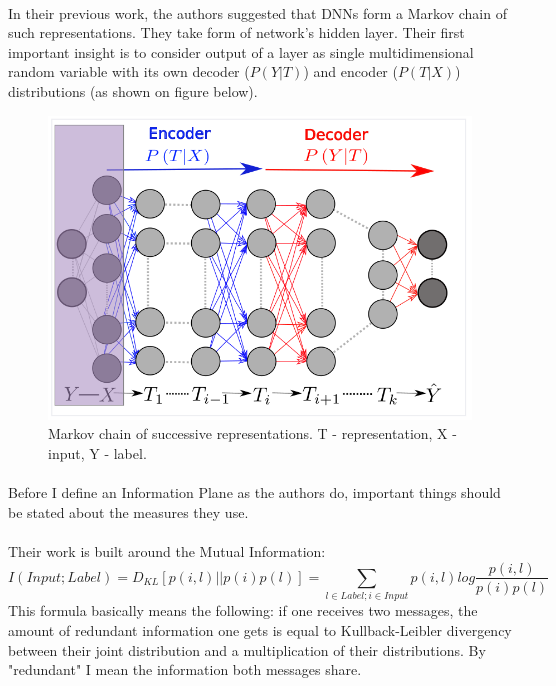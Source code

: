 \documentclass[a4paper,14pt]{extarticle}
\begin{document}
\paragraph{}
In their previous work\cite{tishby2015deep}, the authors suggested that DNNs form a Markov chain of such representations. They take form of network's hidden layer. Their first important insight is to consider output of a layer as single multidimensional random variable with its own decoder ($P(Y|T)$) and encoder ($P(T|X)$) distributions (as shown on figure below).
\begin{figure}[!h]
	\centering
	\includegraphics[width=\textwidth]{../presentation/MarkovChain.png}
	\caption{Markov chain of successive representations. T - representation, X - input, Y - label.}
\end{figure}
\paragraph{}
Before I define an Information Plane as the authors do, important things should be stated about the measures they use.
\paragraph{}
Their work is built around the Mutual Information:
\begin{equation}
	I(Input;Label) = D_{KL}[p(i,l)||p(i)p(l)] = \sum_{l \in Label; i \in Input} p(i,l) log\frac{p(i,l)}{p(i)p(l)}
\end{equation}
This formula basically means the following: if one receives two messages, the amount of redundant information one gets is equal to Kullback-Leibler divergency between their joint distribution and a multiplication of their distributions. By "redundant" I mean the information both messages share.
\end{document}
